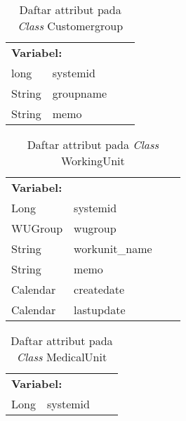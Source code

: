 \begin{table}[H]
	\caption{Daftar attribut pada \textit{Class} Customergroup}
	\centering
	\small
	\begin{adjustbox}{width=1\textwidth}	
		\begin{tabular}{|p{4cm} p{2.1cm} p{3cm} p{3.1cm}|}
			\hline
			\multicolumn{2}{|l}{\textbf{Variabel:}}&\multicolumn{2}{l|}{}\\
			long&systemid&&\\
			String&groupname&&\\
			String&memo&&\\
			\hline
		\end{tabular}
	\end{adjustbox}
\end{table}
\begin{table}[H]
	\caption{Daftar attribut pada \textit{Class} WorkingUnit}
	\centering
	\small
	\begin{adjustbox}{width=1\textwidth}	
		\begin{tabular}{|p{4cm} p{2.1cm} p{3cm} p{3.1cm}|}
			\hline
			\multicolumn{2}{|l}{\textbf{Variabel:}}&\multicolumn{2}{l|}{\textbf{}}\\
			Long&systemid&&\\
			WUGroup&wugroup&&\\
			String&workunit\_name&&\\
			String&memo&&\\
			Calendar&createdate&&\\
			Calendar&lastupdate&&\\
			\hline
		\end{tabular}
	\end{adjustbox}
\end{table}
\begin{table}[H]
	\caption{Daftar attribut pada \textit{Class} MedicalUnit}
	\centering
	\small
	\begin{adjustbox}{width=1\textwidth}	
		\begin{tabular}{|p{4cm} p{2.1cm} p{3cm} p{3.1cm}|}
			\hline
			\multicolumn{2}{|l}{\textbf{Variabel:}}&\multicolumn{2}{l|}{}\\
			Long&systemid&&\\
			\hline
		\end{tabular}
	\end{adjustbox}
\end{table}
